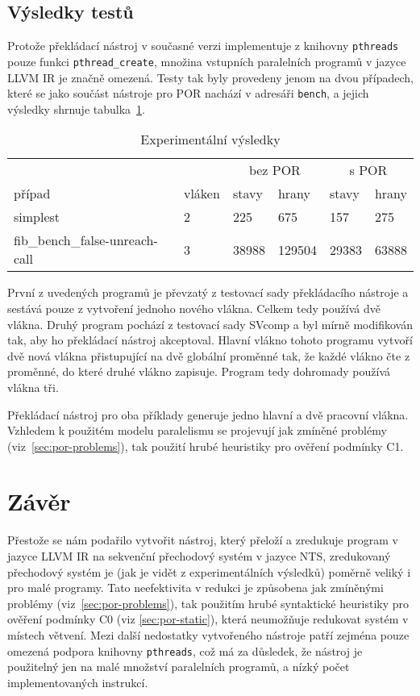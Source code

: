 \documentclass[12pt]{fithesis2}
\begin{document}
\section{Výsledky testů}
Protože překládací nástroj v současné verzi implementuje z knihovny \texttt{pthreads} pouze funkci \texttt{pthread\_create}, množina vstupních paralelních programů v jazyce LLVM IR je značně omezená. Testy tak byly provedeny jenom na dvou případech, které se jako součást nástroje pro POR nachází v adresáři \texttt{bench}, a jejich výsledky shrnuje tabulka~\ref{tbl:experimental-results}.

\begin{table}
\begin{tabular}{|l|l|l|l|l|l|}
\hline
&&\multicolumn{2}{c|}{bez POR} & \multicolumn{2}{c|}{s POR} \\
případ & vláken & stavy & hrany & stavy & hrany \\
\hline
simplest & 2 & 225 & 675 & 157 & 275\\
fib\_bench\_false-unreach-call & 3 & 38988 & 129504 & 29383 & 63888 \\
\hline
\end{tabular}
\caption{Experimentální výsledky}
\label{tbl:experimental-results}
\end{table}
První z uvedených programů je převzatý z testovací sady překládacího nástroje a sestává pouze z vytvoření jednoho nového vlákna. Celkem tedy používá dvě vlákna. Druhý program pochází z testovací sady SVcomp a byl mírně modifikován tak, aby ho překládací nástroj akceptoval. Hlavní vlákno tohoto programu vytvoří dvě nová vlákna přistupující na dvě globální proměnné tak, že každé vlákno čte z proměnné, do které druhé vlákno zapisuje. Program tedy dohromady používá vlákna tři.

Překládací nástroj pro oba příklady generuje jedno hlavní a dvě pracovní vlákna. Vzhledem k použitém modelu paralelismu se projevují jak zmíněné problémy (viz~\ref{sec:por-problems}), tak použití hrubé heuristiky pro ověření podmínky C1.


\chapter{Závěr}
Přestože se nám podařilo vytvořit nástroj, který přeloží a zredukuje program v jazyce LLVM IR na sekvenční přechodový systém v jazyce NTS, zredukovaný přechodový systém je (jak je vidět z experimentálních výsledků) poměrně veliký i pro malé programy. Tato neefektivita v redukci je způsobena jak zmíněnými problémy (viz~\ref{sec:por-problems}), tak použitím hrubé syntaktické heuristiky pro ověření podmínky C0 (viz \ref{sec:por-static}), která neumožňuje redukovat systém v místech větvení. Mezi další nedostatky vytvořeného nástroje patří zejména pouze omezená podpora knihovny \texttt{pthreads}, což má za důsledek, že nástroj je použitelný jen na malé množství paralelních programů, a nízký počet implementovaných instrukcí.
\end{document}
